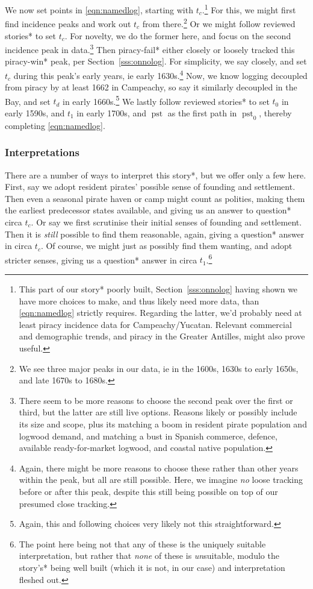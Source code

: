 \documentclass{amsart}
\DeclareMathOperator{\pst}{pst} %
\theoremstyle{definition}
\theoremstyle{remark}
\begin{document}
		We now set points in \ref{eqn:namedlog}, starting with \(t_c\).\footnote{This part of our story* poorly built, Section~\ref{sss:onnolog} having shown we have more choices to make, and thus likely need more data, than \ref{eqn:namedlog} strictly requires. Regarding the latter, we'd probably need at least piracy incidence data for Campeachy/Yucatan. Relevant commercial and demographic trends, and piracy in the Greater Antilles, might also prove useful.} For this, we might first find incidence peaks and work out \(t_c\) from there.\footnote{We see three major peaks in our data, ie in the 1600s, 1630s to early 1650s, and late 1670s to 1680s.} Or we might follow reviewed stories* to set \(t_c\). For novelty, we do the former here, and focus on the second incidence peak in data.\footnote{There seem to be more reasons to choose the second peak over the first or third, but the latter are still live options. Reasons likely or possibly include its size and scope, plus its matching a boom in resident pirate population and logwood demand, and matching a bust in Spanish commerce, defence, available ready-for-market logwood, and coastal native population.} Then piracy-fail* either closely or loosely tracked this piracy-win* peak, per Section~\ref{sss:onnolog}. For simplicity, we say closely, and set \(t_c\) during this peak's early years, ie early 1630s.\footnote{Again, there might be more reasons to choose these rather than other years within the peak, but all are still possible. Here, we imagine \emph{no} loose tracking before or after this peak, despite this still being possible on top of our presumed close tracking.} Now, we know logging decoupled from piracy by at least 1662 in Campeachy, so say it similarly decoupled in the Bay, and set \(t_d\) in early 1660s.\footnote{Again, this and following choices very likely not this straightforward.} We lastly follow reviewed stories* to set \(t_0\) in early 1590s, and \(t_1\) in early 1700s, and \(\pst\) as the first path in \(\pst_0\), thereby completing \ref{eqn:namedlog}.
		\subsubsection{Interpretations}
		\label{sss:storyinterpret}
		There are a number of ways to interpret this story*, but we offer only a few here. First, say we adopt resident pirates' possible sense of founding and settlement. Then even a seasonal pirate haven or camp might count as polities, making them the earliest predecessor states available, and giving us an answer to question* circa \(t_c\). Or say we first scrutinise their initial senses of founding and settlement. Then it is \emph{still} possible to find them reasonable, again, giving a question* answer in circa \(t_c\). Of course, we might just as possibly find them wanting, and adopt stricter senses, giving us a question* answer in circa \(t_1\).\footnote{The point here being not that any of these is the uniquely suitable interpretation, but rather that \emph{none} of these is \emph{un}suitable, modulo the story's* being well built (which it is not, in our case) and interpretation fleshed out.}
%
%
%
\end{document}
